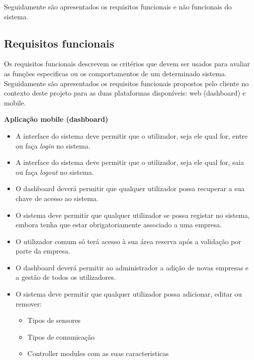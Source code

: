 Seguidamente são apresentados os requisitos funcionais e não funcionais do sistema. 




\subsection{Requisitos funcionais}


Os requisitos funcionais descrevem os critérios que devem ser usados para avaliar as funções especificas ou os comportamentos de um determinado sistema. Seguidamente são apresentados os requisitos funcionais propostos pelo cliente no contexto deste projeto para as duas plataformas disponíveis: web (dashboard) e mobile. 


\textbf{Aplicação mobile (dashboard)}


\begin{itemize}
	\item A interface do sistema deve permitir que o utilizador, seja ele qual for, entre ou faça \textit{login} no sistema. 
	
	\item A interface do sistema deve permitir que o utilizador, seja ele qual for, saia ou faça \textit{logout} no sistema.
	
	\item O dashboard deverá permitir que qualquer utilizador possa recuperar a sua chave de acesso ao sistema.
	
	\item O sistema deve permitir que qualquer utilizador se possa registar no sistema, embora tenha que estar obrigatoriamente associado a uma empresa.
	
	\item O utilizador comum só terá acesso à sua área reserva após a validação por parte da empresa.   
	
	\item O dashboard deverá permitir ao administrador a adição de novas empresas e a gestão de todos os utilizadores. 
	
	\item O sistema deve permitir que qualquer utilizador possa adicionar, editar ou remover: 
	\begin{itemize}
		\item Tipos de sensores
		
		\item Tipos de comunicação
		
		\item Controller modules com as suas caracteristicas
		

\end{itemize}
\end{itemize}
